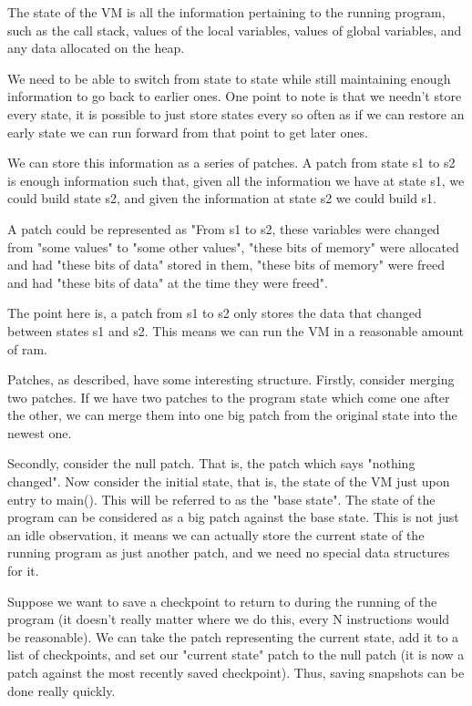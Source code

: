 \documentclass[10pt,a4paper]{report}
\begin{document}
The state of the VM is all the information pertaining to the running program, such as the call stack, values of the local variables, values of global variables, and any data allocated on the heap.

We need to be able to switch from state to state while still maintaining enough information to go back to earlier ones. One point to note is that we needn't store every state, it is possible to just store states every so often as if we can restore an early state we can run forward from that point to get later ones.

We can store this information as a series of patches. A patch from state s1 to s2 is enough information such that, given all the information we have at state s1, we could build state s2, and given the information at state s2 we could build s1.

A patch could be represented as "From s1 to s2, these variables were changed from "some values" to "some other values", "these bits of memory" were allocated and had "these bits of data" stored in them, "these bits of memory" were freed and had "these bits of data" at the time they were freed".

The point here is, a patch from s1 to s2 only stores the data that changed between states s1 and s2. This means we can run the VM in a reasonable amount of ram.

Patches, as described, have some interesting structure. Firstly, consider merging two patches. If we have two patches to the program state which come one after the other, we can merge them into one big patch from the original state into the newest one.

Secondly, consider the null patch. That is, the patch which says "nothing changed". Now consider the initial state, that is, the state of the VM just upon entry to main(). This will be referred to as the "base state". The state of the program can be considered as a big patch against the base state. This is not just an idle observation, it means we can actually store the current state of the running program as just another patch, and we need no special data structures for it.

Suppose we want to save a checkpoint to return to during the running of the program (it doesn't really matter where we do this, every N instructions would be reasonable). We can take the patch representing the current state, add it to a list of checkpoints, and set our "current state" patch to the null patch (it is now a patch against the most recently saved checkpoint). Thus, saving snapshots can be done really quickly.
\end{document}
